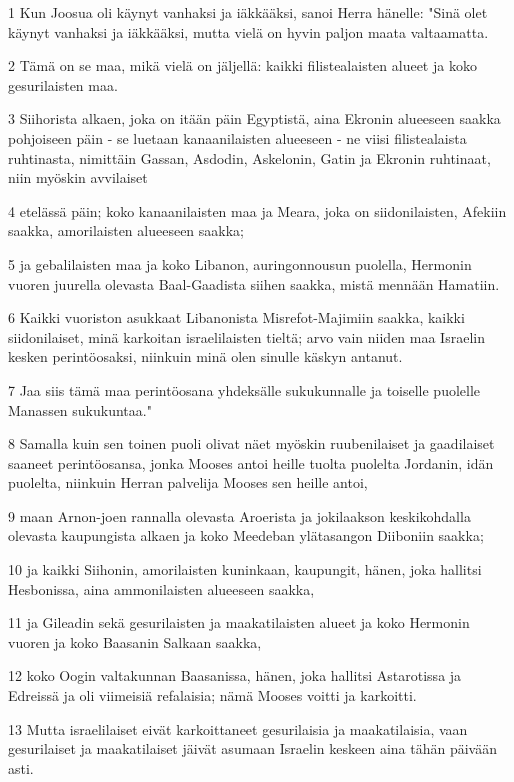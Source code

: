 \par 1 Kun Joosua oli käynyt vanhaksi ja iäkkääksi, sanoi Herra hänelle: "Sinä olet käynyt vanhaksi ja iäkkääksi, mutta vielä on hyvin paljon maata valtaamatta.
\par 2 Tämä on se maa, mikä vielä on jäljellä: kaikki filistealaisten alueet ja koko gesurilaisten maa.
\par 3 Siihorista alkaen, joka on itään päin Egyptistä, aina Ekronin alueeseen saakka pohjoiseen päin - se luetaan kanaanilaisten alueeseen - ne viisi filistealaista ruhtinasta, nimittäin Gassan, Asdodin, Askelonin, Gatin ja Ekronin ruhtinaat, niin myöskin avvilaiset
\par 4 etelässä päin; koko kanaanilaisten maa ja Meara, joka on siidonilaisten, Afekiin saakka, amorilaisten alueeseen saakka;
\par 5 ja gebalilaisten maa ja koko Libanon, auringonnousun puolella, Hermonin vuoren juurella olevasta Baal-Gaadista siihen saakka, mistä mennään Hamatiin.
\par 6 Kaikki vuoriston asukkaat Libanonista Misrefot-Majimiin saakka, kaikki siidonilaiset, minä karkoitan israelilaisten tieltä; arvo vain niiden maa Israelin kesken perintöosaksi, niinkuin minä olen sinulle käskyn antanut.
\par 7 Jaa siis tämä maa perintöosana yhdeksälle sukukunnalle ja toiselle puolelle Manassen sukukuntaa."
\par 8 Samalla kuin sen toinen puoli olivat näet myöskin ruubenilaiset ja gaadilaiset saaneet perintöosansa, jonka Mooses antoi heille tuolta puolelta Jordanin, idän puolelta, niinkuin Herran palvelija Mooses sen heille antoi,
\par 9 maan Arnon-joen rannalla olevasta Aroerista ja jokilaakson keskikohdalla olevasta kaupungista alkaen ja koko Meedeban ylätasangon Diiboniin saakka;
\par 10 ja kaikki Siihonin, amorilaisten kuninkaan, kaupungit, hänen, joka hallitsi Hesbonissa, aina ammonilaisten alueeseen saakka,
\par 11 ja Gileadin sekä gesurilaisten ja maakatilaisten alueet ja koko Hermonin vuoren ja koko Baasanin Salkaan saakka,
\par 12 koko Oogin valtakunnan Baasanissa, hänen, joka hallitsi Astarotissa ja Edreissä ja oli viimeisiä refalaisia; nämä Mooses voitti ja karkoitti.
\par 13 Mutta israelilaiset eivät karkoittaneet gesurilaisia ja maakatilaisia, vaan gesurilaiset ja maakatilaiset jäivät asumaan Israelin keskeen aina tähän päivään asti.
